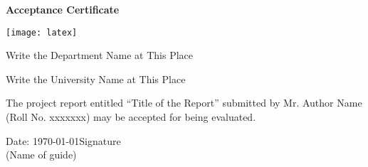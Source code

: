 \cleardoublepage
{}

\begin{center}
	{\LARGE\textbf{Acceptance Certificate}}
	\vspace{3\baselineskip}
	
	\texttt{[image: latex]}
	\vspace{2.5\baselineskip}
	
	{\large Write the Department Name at This Place\\
		\vspace{0.35\baselineskip} 
		
		Write the University Name at This Place}
\end{center}
\vspace{2.5\baselineskip}

\noindent 
The project report entitled ``Title of the Report'' submitted by Mr. Author Name (Roll No. xxxxxxx) may be accepted for being evaluated.


\vspace{\fill}

Date: \today \hfill                                         Signature\\
\null\hfill                                              (Name of guide)


\restoregeometry 



